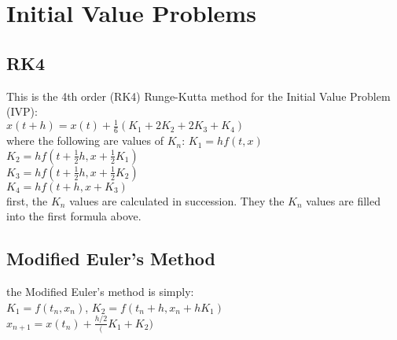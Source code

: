 \section{Initial Value Problems}
\subsection*{RK4}
This is the 4th order (RK4) Runge-Kutta
method for the Initial Value Problem (IVP):\\
$x(t+h) = x(t) + \frac{1}{6}( K_1  + 2K_2 + 2K_3 + K_4) $\\
where the following are values of $K_n$:
$ K_1 = h f(t,x)    $\\
$ K_2 = h f(t + \frac{1}{2} h , x + \frac{1}{2} K_1)    $\\
$ K_3 = h f(t + \frac{1}{2} h , x + \frac{1}{2} K_2)    $\\
$ K_4 = h f(t + h ,x + K_3)    $\\
first, the $K_n$ values are calculated in succession. They the $K_n$
values are filled into the first formula above.
\subsection*{Modified Euler's Method}
the Modified Euler's method is simply:\\
$K_1 = f(t_n,x_n)$, $K_2 = f(t_n + h, x_n + h K_1)$\\
$x_{n+1} = x(t_n) + \frac{h/2}(K_1 + K_2)$ 
